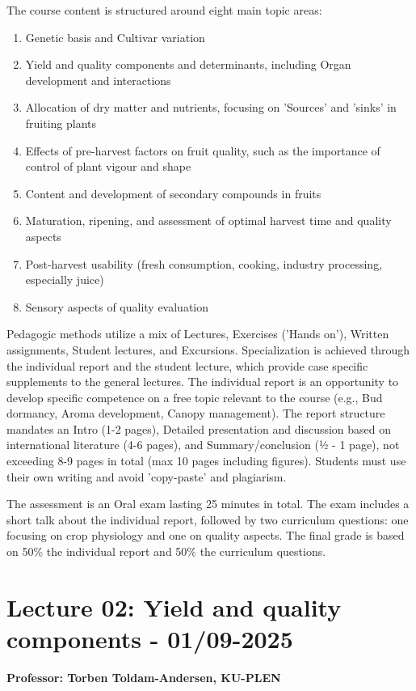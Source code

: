 \vspace{0.5em}
The course content is structured around eight main topic areas: 

\begin{enumerate}
    \item Genetic basis and Cultivar variation
    \item Yield and quality components and determinants, including Organ development and interactions
    \item Allocation of dry matter and nutrients, focusing on 'Sources' and 'sinks' in fruiting plants
    \item Effects of pre-harvest factors on fruit quality, such as the importance of control of plant vigour and shape
    \item Content and development of secondary compounds in fruits
    \item Maturation, ripening, and assessment of optimal harvest time and quality aspects
    \item Post-harvest usability (fresh consumption, cooking, industry processing, especially juice)
    \item Sensory aspects of quality evaluation
\end{enumerate}

\vspace{0.5em}
Pedagogic methods utilize a mix of Lectures, Exercises ('Hands on'), Written assignments, Student lectures, and Excursions. Specialization is achieved through the individual report and the student lecture, which provide case specific supplements to the general lectures. The individual report is an opportunity to develop specific competence on a free topic relevant to the course (e.g., Bud dormancy, Aroma development, Canopy management). The report structure mandates an Intro (1-2 pages), Detailed presentation and discussion based on international literature (4-6 pages), and Summary/conclusion (½ - 1 page), not exceeding 8-9 pages in total (max 10 pages including figures). Students must use their own writing and avoid 'copy-paste' and plagiarism.

\vspace{0.5em}
The assessment is an Oral exam lasting 25 minutes in total. The exam includes a short talk about the individual report, followed by two curriculum questions: one focusing on crop physiology and one on quality aspects. The final grade is based on 50\% the individual report and 50\% the curriculum questions.

\section{Lecture 02: Yield and quality components - 01/09-2025}
\textbf{Professor: Torben Toldam-Andersen, KU-PLEN}

